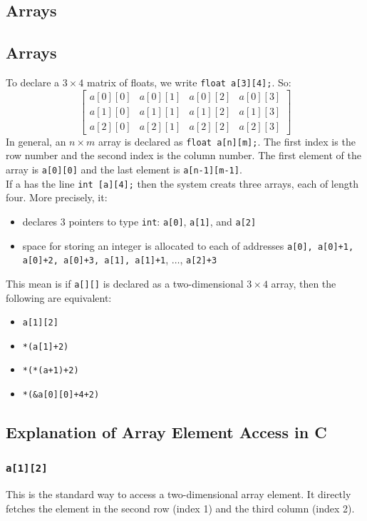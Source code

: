 \documentclass[a4paper, 10pt]{article}
\begin{document}
\subsection{Arrays}
\subsection{Arrays}
To declare a $3 \times 4$ matrix of floats, we write \texttt{float a[3][4];}. So:
$$\begin{bmatrix}
        a[0][0] & a[0][1] & a[0][2] & a[0][3] \\
        a[1][0] & a[1][1] & a[1][2] & a[1][3] \\
        a[2][0] & a[2][1] & a[2][2] & a[2][3]
    \end{bmatrix}
$$
In general, an $n \times m$ array is declared as \texttt{float a[n][m];}. The first index is the row number and the second index is the column number. The first element of the array is \texttt{a[0][0]} and the last element is \texttt{a[n-1][m-1]}. \\[2ex]
If a has the line \texttt{int [a][4];} then the system creats three arrays, each of length four. More precisely, it:
\begin{itemize}
    \item declares 3 pointers to type \texttt{int}: \texttt{a[0]}, \texttt{a[1]}, and \texttt{a[2]}
    \item space for storing an integer is allocated to each of addresses \texttt{a[0], a[0]+1, a[0]+2, a[0]+3, a[1], a[1]+1}, $\dots$, \texttt{a[2]+3}
\end{itemize}
This mean is if \texttt{a[][]} is declared as a two-dimensional $3 \times 4$ array, then the following are equivalent:
\begin{itemize}
    \item \texttt{a[1][2]}
    \item \texttt{*(a[1]+2)}
    \item \texttt{*(*(a+1)+2)}
    \item \texttt{*(\&a[0][0]+4+2)}
\end{itemize}
\pagebreak
\subsection{Explanation of Array Element Access in C}

\subsubsection*{\texttt{a[1][2]}}
This is the standard way to access a two-dimensional array element. It directly fetches the element in the second row (index 1) and the third column (index 2).
\end{document}
